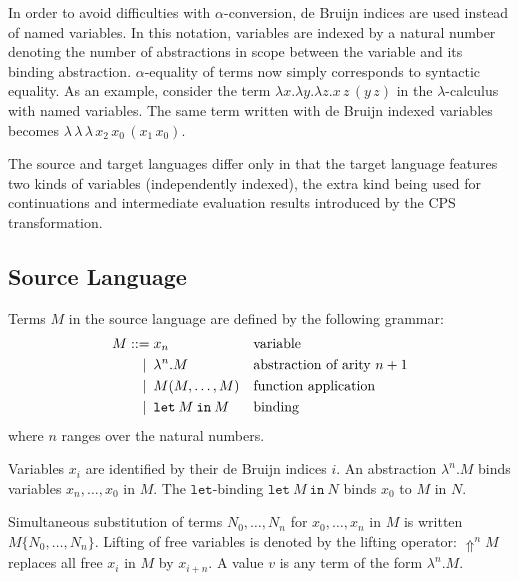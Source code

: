 \documentclass[a4paper,11pt,draft]{article}
\newcommand{\kw}[1]{\mathtt{#1}}
\begin{document}
In order to avoid difficulties with $\alpha$-conversion, de Bruijn indices
are used instead of named variables.
In this notation, variables are indexed by a natural number denoting the
number of abstractions in scope between the variable and its binding
abstraction.
$\alpha$-equality of terms now simply corresponds to syntactic equality.
As an example, consider the term
$\lambda x. \lambda y. \lambda z. x \, z \, (y \, z)$ in the
$\lambda$-calculus with named variables.
The same term written with de Bruijn indexed variables becomes
$\lambda \, \lambda \, \lambda \, x_{2} \, x_{0} \, (x_{1} \, x_{0})$.

The source and target languages differ only in that the target language
features two kinds of variables (independently indexed), the extra kind being
used for continuations and intermediate evaluation results introduced by the
CPS transformation.

\subsection{Source Language}

Terms $M$ in the source language are defined by the following grammar:
\begin{align*}
M ::=             &\; x_{n}
                  && \text{variable} \\
\llap{\textbar\:} &\; \lambda^{n}.M
                  && \text{abstraction of arity $n+1$} \\
\llap{\textbar\:} &\; M(M, \ldots, M)
                  && \text{function application} \\
\llap{\textbar\:} &\; \kw{let} \: M \: \kw{in} \: M
                  && \text{binding}
\end{align*}
where $n$ ranges over the natural numbers.

Variables $x_{i}$ are identified by their de Bruijn indices $i$.
An abstraction $\lambda^{n}.M$ binds variables $x_{n}, \ldots, x_{0}$ in $M$. The
$\kw{let}$-binding $\kw{let} \: M \: \kw{in} \: N$ binds $x_{0}$ to $M$ in $N$.

Simultaneous substitution of terms $N_{0}, \ldots, N_{n}$ for
$x_{0}, \ldots, x_{n}$ in $M$ is written $M\{N_{0}, \ldots, N_{n}\}$.
Lifting of free variables is denoted by the lifting operator: $\Uparrow^{n} M$
replaces all free $x_{i}$ in $M$ by $x_{i+n}$. A value $v$ is any term of the
form $\lambda^{n}.M$.

\paragraph{}
\end{document}
